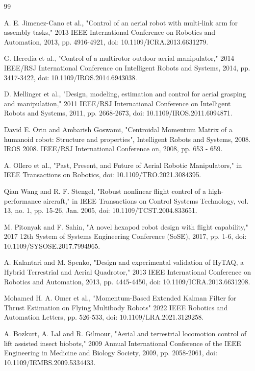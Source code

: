 \begin{thebibliography}{99}

 A. E. Jimenez-Cano et al., "Control of an aerial robot with multi-link arm for assembly tasks," 2013 IEEE International Conference on Robotics and Automation, 2013, pp. 4916-4921, doi: 10.1109/ICRA.2013.6631279.

 G. Heredia et al., "Control of a multirotor outdoor aerial manipulator," 2014 IEEE/RSJ International Conference on Intelligent Robots and Systems, 2014, pp. 3417-3422, doi: 10.1109/IROS.2014.6943038.

 D. Mellinger et al., "Design, modeling, estimation and control for aerial grasping and manipulation," 2011 IEEE/RSJ International Conference on Intelligent Robots and Systems, 2011, pp. 2668-2673, doi: 10.1109/IROS.2011.6094871.

 David E. Orin and Ambarish Goswami, "Centroidal Momentum Matrix of a humanoid robot: Structure and properties", Intelligent Robots and Systems, 2008. IROS 2008. IEEE/RSJ International Conference on, 2008, pp. 653 - 659.

 A. Ollero et al., "Past, Present, and Future of Aerial Robotic Manipulators," in IEEE Transactions on Robotics, doi: 10.1109/TRO.2021.3084395.

 Qian Wang and R. F. Stengel, "Robust nonlinear flight control of a high-performance aircraft," in IEEE Transactions on Control Systems Technology, vol. 13, no. 1, pp. 15-26, Jan. 2005, doi: 10.1109/TCST.2004.833651.

M. Pitonyak and F. Sahin, "A novel hexapod robot design with flight capability," 2017 12th System of Systems Engineering Conference (SoSE), 2017, pp. 1-6, doi: 10.1109/SYSOSE.2017.7994965.

 A. Kalantari and M. Spenko, "Design and experimental validation of HyTAQ, a Hybrid Terrestrial and Aerial Quadrotor," 2013 IEEE International Conference on Robotics and Automation, 2013, pp. 4445-4450, doi: 10.1109/ICRA.2013.6631208.

 Mohamed H. A. Omer et al., "Momentum-Based Extended Kalman Filter for Thrust Estimation on Flying Multibody Robots" 2022 IEEE Robotics and Automation Letters, pp. 526-533, doi: 10.1109/LRA.2021.3129258.
  

 A. Bozkurt, A. Lal and R. Gilmour, "Aerial and terrestrial locomotion control of lift assisted insect biobots," 2009 Annual International Conference of the IEEE Engineering in Medicine and Biology Society, 2009, pp. 2058-2061, doi: 10.1109/IEMBS.2009.5334433.


\end{thebibliography}
